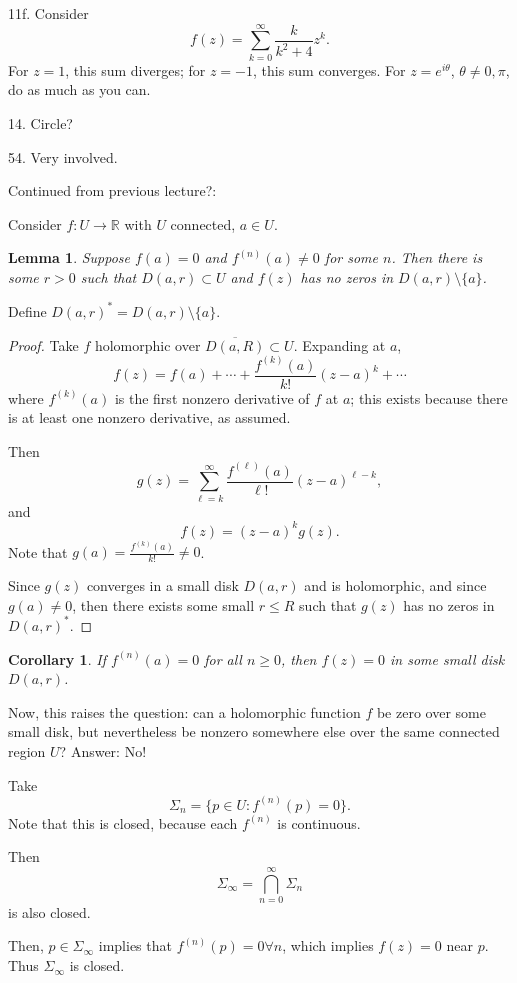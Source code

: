 \documentclass{artikel3}
\date{\formatdate{2012}{04}{23}}
\newcommand{\complex}{\mathbb{R}}
\newtheorem{lem}{Lemma}
\newtheorem{cor}{Corollary}
\numberwithin{equation}{enumi}
\begin{document}
11f. Consider \[
	f(z)=\sum_{k=0}^{\infty} \frac{k}{k^2+4}z^k.
\] For $z=1$, this sum diverges; for $z=-1$, this sum converges.
For $z=e^{i\theta}$, $\theta\neq 0,\pi$, do as much as you can.

14. Circle?

54. Very involved.

Continued from previous lecture?:

Consider $f:U\to\complex$ with $U$ connected, $a\in U$.
\begin{lem}
	Suppose $f(a)=0$ and $f^{(n)}(a)\neq 0$ for some $n$.  Then there
	is some $r>0$ such that $D(a,r)\subset U$ and $f(z)$ has no
	zeros in $D(a,r)\setminus \{a\}$.
\end{lem}

Define $D(a,r)^*=D(a,r)\setminus\{a\}$.

\begin{proof}
	Take $f$ holomorphic over $\overline{D(a,R)}\subset U$.
	Expanding at $a$, \[
		f(z)=f(a)+\cdots+\frac{f^{(k)}(a)}{k!}(z-a)^k+\cdots
	\] where $f^{(k)}(a)$ is the first nonzero derivative of $f$
	at $a$; this exists because there is at least one nonzero
	derivative, as assumed.
	
	Then \[
		g(z)=\sum_{\ell=k}^{\infty}\frac{f^{(\ell)}(a)}{\ell!}(z-a)^{\ell-k},
	\] and \[
		f(z)=(z-a)^kg(z).
	\] Note that $g(a)=\frac{f^{(k)}(a)}{k!}\neq 0$.
	
	Since $g(z)$ converges in a small disk $D(a,r)$ and is holomorphic,
	and since $g(a)\neq 0$, then there exists some small $r\leq R$
	such that $g(z)$ has no zeros in $D(a,r)^*$.
\end{proof}

\begin{cor}
	If $f^{(n)}(a)=0$ for all $n\geq 0$, then $f(z)=0$ in some small
	disk $D(a,r)$.
\end{cor}

Now, this raises the question: can a holomorphic
function $f$ be zero over some small disk, but nevertheless
be nonzero somewhere else over the same connected
region $U$? Answer: No!

Take \[
	\Sigma_n=\{p\in U:f^{(n)}(p)=0\}.
\] Note that this is closed, because each $f^{(n)}$ is
continuous.

Then \[
	\Sigma_\infty=\bigcap_{n=0}^\infty \Sigma_n
\] is also closed.

Then, $p\in \Sigma_\infty$ implies
that $f^{(n)}(p)=0\forall n$, which
implies $f(z)=0$ near $p$.  Thus $\Sigma_\infty$ is closed.
\end{document}

